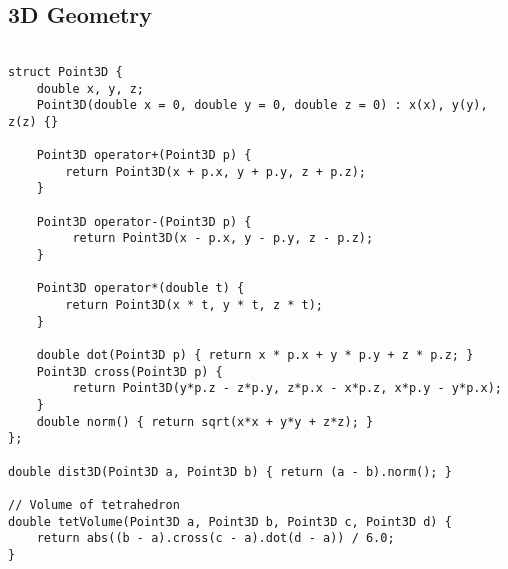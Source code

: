 \documentclass[11pt,a4paper]{article}
\begin{document}
\newpage

\subsection{3D Geometry}
\begin{lstlisting}[caption={3D Point and Vector Operations}]

struct Point3D {
    double x, y, z;
    Point3D(double x = 0, double y = 0, double z = 0) : x(x), y(y), z(z) {}
    
    Point3D operator+(Point3D p) { 
        return Point3D(x + p.x, y + p.y, z + p.z);
    }

    Point3D operator-(Point3D p) {
         return Point3D(x - p.x, y - p.y, z - p.z);
    }

    Point3D operator*(double t) { 
        return Point3D(x * t, y * t, z * t); 
    }
    
    double dot(Point3D p) { return x * p.x + y * p.y + z * p.z; }
    Point3D cross(Point3D p) {
         return Point3D(y*p.z - z*p.y, z*p.x - x*p.z, x*p.y - y*p.x); 
    }
    double norm() { return sqrt(x*x + y*y + z*z); }
};

double dist3D(Point3D a, Point3D b) { return (a - b).norm(); }

// Volume of tetrahedron
double tetVolume(Point3D a, Point3D b, Point3D c, Point3D d) {
    return abs((b - a).cross(c - a).dot(d - a)) / 6.0;
}
\end{lstlisting}
\end{document}
